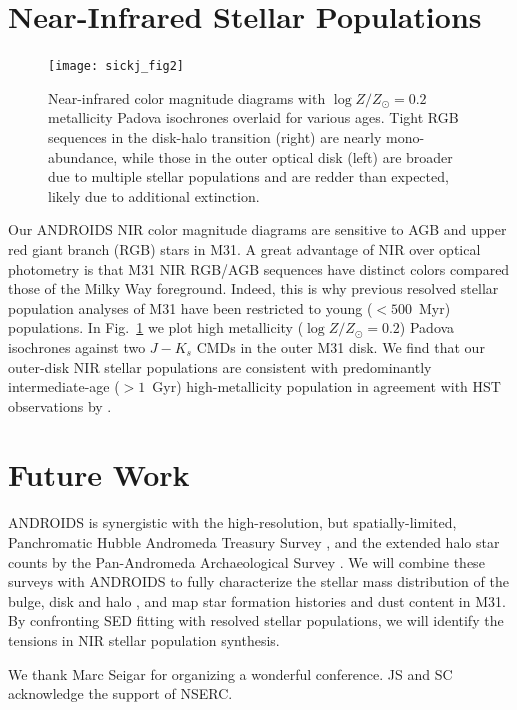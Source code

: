 \documentclass[11pt,twoside]{article}
\begin{document}
\section{Near-Infrared Stellar Populations}

\begin{figure}[t]
\centering
\texttt{[image: sickj\_fig2]}
\caption{Near-infrared color magnitude diagrams with $\log Z/Z_\odot=0.2$ metallicity Padova isochrones overlaid for various ages.
Tight RGB sequences in the disk-halo transition (right) are nearly mono-abundance, while those in the outer optical disk (left) are broader due to multiple stellar populations and are redder than expected, likely due to additional extinction.}
\label{fig:cmd}
\end{figure}

Our ANDROIDS NIR color magnitude diagrams are sensitive to AGB and upper red giant branch (RGB) stars in M31.
A great advantage of NIR over optical photometry is that M31 NIR RGB/AGB sequences have distinct colors compared those of the Milky Way foreground.
Indeed, this is why previous resolved stellar population analyses of M31 \citep[e.g.,][]{Williams:2003} have been restricted to young ($<500$~Myr) populations.
In Fig.~\ref{fig:cmd} we plot high metallicity ($\log Z/Z_\odot = 0.2$) Padova isochrones \citep{Marigo:2008} against two $J-K_s$ CMDs in the outer M31 disk.
We find that our outer-disk NIR stellar populations are consistent with predominantly intermediate-age ($>1$~Gyr) high-metallicity population in agreement with HST observations by \cite{Brown:2006}.

\section{Future Work}

ANDROIDS is synergistic with the high-resolution, but spatially-limited, Panchromatic Hubble Andromeda Treasury Survey \citep{Dalcanton:2012}, and the extended halo star counts by the Pan-Andromeda Archaeological Survey \citep{McConnachie:2009}.
We will combine these surveys with ANDROIDS to fully characterize the stellar mass distribution of the bulge, disk and halo \citep[e.g.,][]{Courteau:2011}, and map star formation histories and dust content in M31.
By confronting SED fitting with resolved stellar populations, we will identify the tensions in NIR stellar population synthesis.

\acknowledgements We thank Marc Seigar for organizing a wonderful conference. JS and SC acknowledge the support of NSERC.


\end{document}
